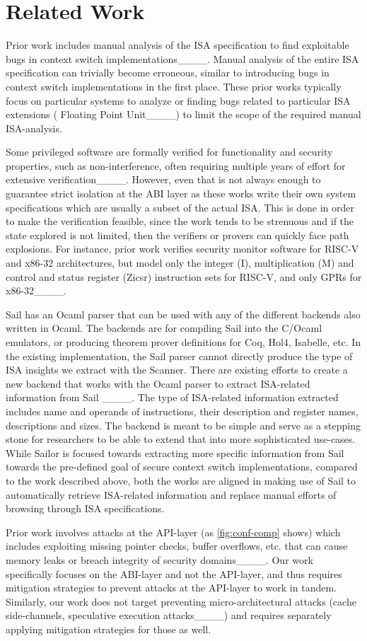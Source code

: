 \section{Related Work}
Prior work includes manual analysis of the ISA specification to find exploitable bugs in context switch implementations____. 
Manual analysis of the entire ISA specification can trivially become erroneous, similar to introducing bugs in context switch implementations in the first place. 
These prior works typically focus on particular systems to analyze or finding bugs related to particular ISA extensions (\eg{} Floating Point Unit____) to limit the scope of the required manual ISA-analysis. 

Some privileged software are formally verified for functionality and security properties, such as non-interference, often requiring multiple years of effort for extensive verification____. 
However, even that is not always enough to guarantee strict isolation at the ABI layer as these works write their own system specifications which are usually a subset of the actual ISA. 
This is done in order to make the verification feasible, since the work tends to be strenuous and if the state explored is not limited, then the verifiers or provers can quickly face path explosions. 
For instance, prior work verifies security monitor software for RISC-V and x86-32 architectures, but model only the integer (I), multiplication (M) and control and status register (Zicsr) instruction sets for RISC-V, and only GPRs for x86-32____. 

Sail has an Ocaml parser that can be used with any of the different backends also written in Ocaml. 
The backends are for compiling Sail into the C/Ocaml emulators, or producing theorem prover definitions for Coq, Hol4, Isabelle, etc. 
In the existing implementation, the Sail parser cannot directly produce the type of ISA insights we extract with the Scanner. 
There are existing efforts to create a new backend that works with the Ocaml parser to extract ISA-related information from Sail ____. 
The type of ISA-related information extracted includes name and operands of instructions, their description and register names, descriptions and sizes. 
The backend is meant to be simple and serve as a stepping stone for researchers to be able to extend that into more sophisticated use-cases. 
While Sailor is focused towards extracting more specific information from Sail towards the pre-defined goal of secure context switch implementations, compared to the work described above, both the works are aligned in making use of Sail to automatically retrieve ISA-related information and replace manual efforts of browsing through ISA specifications. 

Prior work involves attacks at the API-layer (as \autoref{fig:conf-comp} shows) which includes exploiting missing pointer checks, buffer overflows, etc. that can cause memory leaks or breach integrity of security domains____. 
Our work specifically focuses on the ABI-layer and not the API-layer, and thus requires mitigation strategies to prevent attacks at the API-layer to work in tandem. 
Similarly, our work does not target preventing micro-architectural attacks (cache side-channels, speculative execution attacks____) and requires separately applying mitigation strategies for those as well.